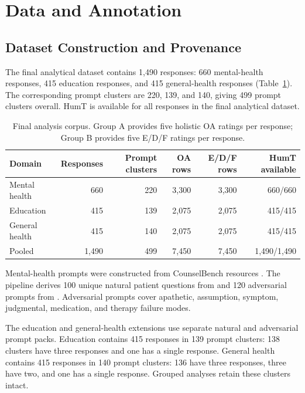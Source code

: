 \documentclass[manuscript,review,anonymous]{acmart}
\begin{document}
\section{Data and Annotation}

\subsection{Dataset Construction and Provenance}

The final analytical dataset contains 1,490 responses: 660 mental-health responses, 415 education responses, and 415 general-health responses (Table~\ref{tab:dataset}). The corresponding prompt clusters are 220, 139, and 140, giving 499 prompt clusters overall. HumT is available for all responses in the final analytical dataset.

\begin{table}[t]
\centering
\caption{Final analysis corpus. Group A provides five holistic OA ratings per response; Group B provides five E/D/F ratings per response.}
\label{tab:dataset}
\begin{tabular}{lrrrrr}
\toprule
Domain & Responses & Prompt clusters & OA rows & E/D/F rows & HumT available\\
\midrule
Mental health & 660 & 220 & 3,300 & 3,300 & 660/660\\
Education & 415 & 139 & 2,075 & 2,075 & 415/415\\
General health & 415 & 140 & 2,075 & 2,075 & 415/415\\
\midrule
Pooled & 1,490 & 499 & 7,450 & 7,450 & 1,490/1,490\\
\bottomrule
\end{tabular}
\end{table}

Mental-health prompts were constructed from CounselBench resources \cite{CounselBench2025}. The pipeline derives 100 unique natural patient questions from  and 120 adversarial prompts from . Adversarial prompts cover apathetic, assumption, symptom, judgmental, medication, and therapy failure modes.

The education and general-health extensions use separate natural and adversarial prompt packs. Education contains 415 responses in 139 prompt clusters: 138 clusters have three responses and one has a single response. General health contains 415 responses in 140 prompt clusters: 136 have three responses, three have two, and one has a single response. Grouped analyses retain these clusters intact.
\end{document}

